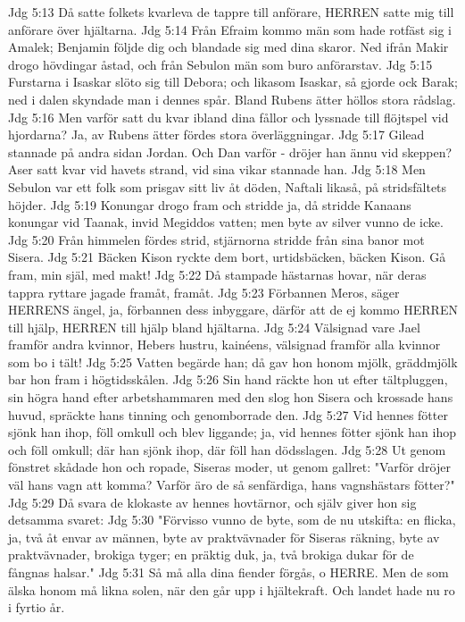 Jdg 5:13  Då satte folkets kvarleva de tappre till anförare, HERREN satte mig till anförare över hjältarna.
Jdg 5:14  Från Efraim kommo män som hade rotfäst sig i Amalek; Benjamin följde dig och blandade sig med dina skaror. Ned ifrån Makir drogo hövdingar åstad, och från Sebulon män som buro anförarstav.
Jdg 5:15  Furstarna i Isaskar slöto sig till Debora; och likasom Isaskar, så gjorde ock Barak; ned i dalen skyndade man i dennes spår. Bland Rubens ätter höllos stora rådslag.
Jdg 5:16  Men varför satt du kvar ibland dina fållor och lyssnade till flöjtspel vid hjordarna? Ja, av Rubens ätter fördes stora överläggningar.
Jdg 5:17  Gilead stannade på andra sidan Jordan. Och Dan varför - dröjer han ännu vid skeppen? Aser satt kvar vid havets strand, vid sina vikar stannade han.
Jdg 5:18  Men Sebulon var ett folk som prisgav sitt liv åt döden, Naftali likaså, på stridsfältets höjder.
Jdg 5:19  Konungar drogo fram och stridde ja, då stridde Kanaans konungar vid Taanak, invid Megiddos vatten; men byte av silver vunno de icke.
Jdg 5:20  Från himmelen fördes strid, stjärnorna stridde från sina banor mot Sisera.
Jdg 5:21  Bäcken Kison ryckte dem bort, urtidsbäcken, bäcken Kison. Gå fram, min själ, med makt!
Jdg 5:22  Då stampade hästarnas hovar, när deras tappra ryttare jagade framåt, framåt.
Jdg 5:23  Förbannen Meros, säger HERRENS ängel, ja, förbannen dess inbyggare, därför att de ej kommo HERREN till hjälp, HERREN till hjälp bland hjältarna.
Jdg 5:24  Välsignad vare Jael framför andra kvinnor, Hebers hustru, kainéens, välsignad framför alla kvinnor som bo i tält!
Jdg 5:25  Vatten begärde han; då gav hon honom mjölk, gräddmjölk bar hon fram i högtidsskålen.
Jdg 5:26  Sin hand räckte hon ut efter tältpluggen, sin högra hand efter arbetshammaren med den slog hon Sisera och krossade hans huvud, spräckte hans tinning och genomborrade den.
Jdg 5:27  Vid hennes fötter sjönk han ihop, föll omkull och blev liggande; ja, vid hennes fötter sjönk han ihop och föll omkull; där han sjönk ihop, där föll han dödsslagen.
Jdg 5:28  Ut genom fönstret skådade hon och ropade, Siseras moder, ut genom gallret: "Varför dröjer väl hans vagn att komma? Varför äro de så senfärdiga, hans vagnshästars fötter?"
Jdg 5:29  Då svara de klokaste av hennes hovtärnor, och själv giver hon sig detsamma svaret:
Jdg 5:30  "Förvisso vunno de byte, som de nu utskifta: en flicka, ja, två åt envar av männen, byte av praktvävnader för Siseras räkning, byte av praktvävnader, brokiga tyger; en präktig duk, ja, två brokiga dukar för de fångnas halsar."
Jdg 5:31  Så må alla dina fiender förgås, o HERRE. Men de som älska honom må likna solen, när den går upp i hjältekraft. Och landet hade nu ro i fyrtio år.
